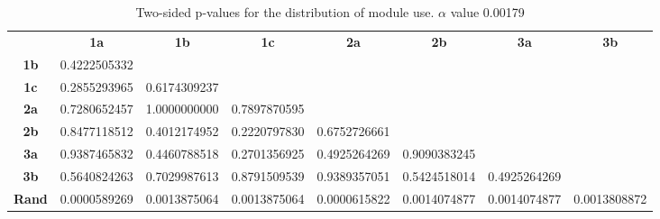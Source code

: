 \begin{table}[h!]
    \centering
    \begin{tabular}{cccccccc}
                  & \textbf{1a}  & \textbf{1b}  & \textbf{1c}  & \textbf{2a}  & \textbf{2b}  & \textbf{3a}  & \textbf{3b}  \\
    \textbf{1b}   & 0.4222505332 &              &              &              &              &              &              \\
    \textbf{1c}   & 0.2855293965 & 0.6174309237 &              &              &              &              &              \\
    \textbf{2a}   & 0.7280652457 & 1.0000000000 & 0.7897870595 &              &              &              &              \\
    \textbf{2b}   & 0.8477118512 & 0.4012174952 & 0.2220797830 & 0.6752726661 &              &              &              \\
    \textbf{3a}   & 0.9387465832 & 0.4460788518 & 0.2701356925 & 0.4925264269 & 0.9090383245 &              &              \\
    \textbf{3b}   & 0.5640824263 & 0.7029987613 & 0.8791509539 & 0.9389357051 & 0.5424518014 & 0.4925264269 &              \\
    \textbf{Rand} & 0.0000589269 & 0.0013875064 & 0.0013875064 & 0.0000615822 & 0.0014074877 & 0.0014074877 & 0.0013808872
    \end{tabular}
    \caption[p-table for capacity use]{Two-sided p-values for the distribution of module use. \(\alpha\) value 0.00179}
    \label{tab:exp2.capacityptable}
\end{table}
